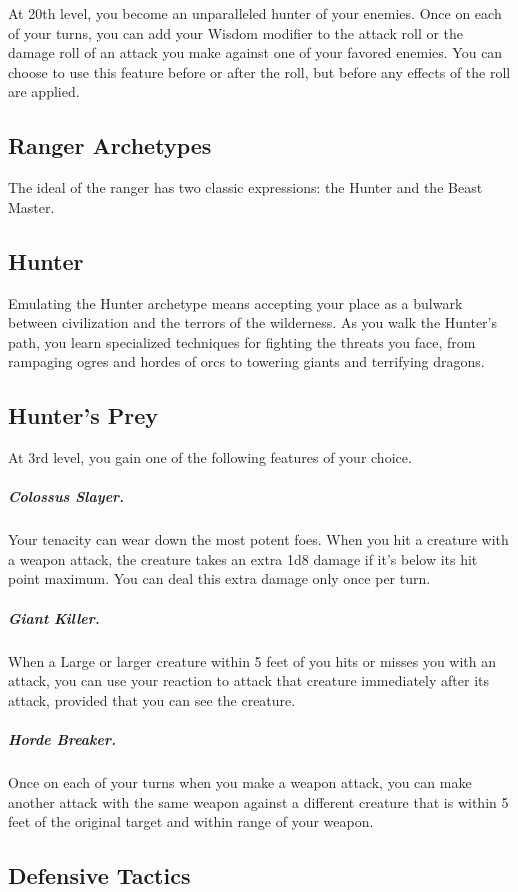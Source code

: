 At 20th level, you become an unparalleled hunter of your enemies. Once on each of your turns, you can add your Wisdom modifier to the attack roll or the damage roll of an attack you make against one of your favored enemies. You can choose to use this feature before or after the roll, but before any effects of the roll are applied.

\subsection{Ranger Archetypes}

The ideal of the ranger has two classic expressions: the Hunter and the Beast Master.

\subsection{Hunter}

Emulating the Hunter archetype means accepting your place as a bulwark between civilization and the terrors of the wilderness. As you walk the Hunter's path, you learn specialized techniques for fighting the threats you face, from rampaging ogres and hordes of orcs to towering giants and terrifying dragons.

\subsection{Hunter's Prey}

At 3rd level, you gain one of the following features of your choice.

\subparagraph*{Colossus Slayer.} Your tenacity can wear down the most potent foes. When you hit a creature with a weapon attack, the creature takes an extra 1d8 damage if it's below its hit point maximum. You can deal this extra damage only once per turn.

\subparagraph*{Giant Killer.} When a Large or larger creature within 5 feet of you hits or misses you with an attack, you can use your reaction to attack that creature immediately after its attack, provided that you can see the creature.

\subparagraph*{Horde Breaker.} Once on each of your turns when you make a weapon attack, you can make another attack with the same weapon against a different creature that is within 5 feet of the original target and within range of your weapon.

\subsection{Defensive Tactics}

